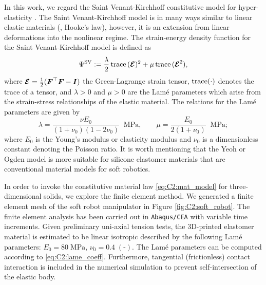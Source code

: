 In this work, we regard the Saint Venant-Kirchhoff constitutive model for hyper-elasticity \cite{Kim2018,Holzapfel2002}. The Saint Venant-Kirchhoff model is in many ways similar to linear elastic materials (\ie, Hooke's law), however, it is an extension from linear deformations into the nonlinear regime. The strain-energy density function for the Saint Venant-Kirchhoff model is defined as
%
\begin{equation}
\Psi^{\textrm{SV}} := \frac{\lambda}{2}\,\text{trace}\,(\boldsymbol{\mathcal{E}})^2 + \mu\,\text{trace}\,(\boldsymbol{\mathcal{E}}^2),
\label{eq:C2:mat_model}
\end{equation}
%
\noindent where $\boldsymbol{\mathcal{E}} = \frac{1}{2}(\boldsymbol{F}^\top\boldsymbol{F} - \boldsymbol{I})$ the Green-Lagrange strain tensor, $\text{trace}(\cdot)$ denotes the trace of a tensor, and $\lambda > 0$ and $\mu > 0$ are the Lam\'{e} parameters which arise from the strain-stress relationships of the elastic material. The relations for the Lam\'{e} parameters are given by
\begin{equation}
%
\lambda = \frac{\nu E_0}{(1+\nu_0)(1-2\nu_0)} \;\; \si{\mega \pascal}, \quad \quad \mu = \frac{E_0}{2(1+\nu_0)} \;\; \si{\mega \pascal};
\label{eq:C2:lame_coeff}
\end{equation}
%
where $E_0$ is the Young's modulus or elasticity modulus and $\nu_0$ is a dimensionless constant denoting the Poisson ratio. It is worth mentioning that the Yeoh or Ogden model is more suitable for silicone elastomer materials that are conventional material models for soft robotics.

In order to invoke the constitutive material law \eqref{eq:C2:mat_model} for three-dimensional solids, we explore the finite element method. We generated a finite element mesh of the soft robot manipulator in Figure \ref{fig:C2:soft_robot}. The finite element analysis has been carried out in \texttt{Abaqus/CEA} with variable time increments. Given preliminary uni-axial tension tests, the 3D-printed elastomer material is estimated to be linear isotropic described by the following Lam\'{e} parameters: $E_0  = 80 \; \si{\mega \pascal}$, $\nu_0 = 0.4 \; (\text{-})$. The Lam\'{e} parameters can be computed according to \eqref{eq:C2:lame_coeff}. Furthermore, tangential (frictionless) contact interaction is included in the numerical simulation to prevent self-intersection of the elastic body.

